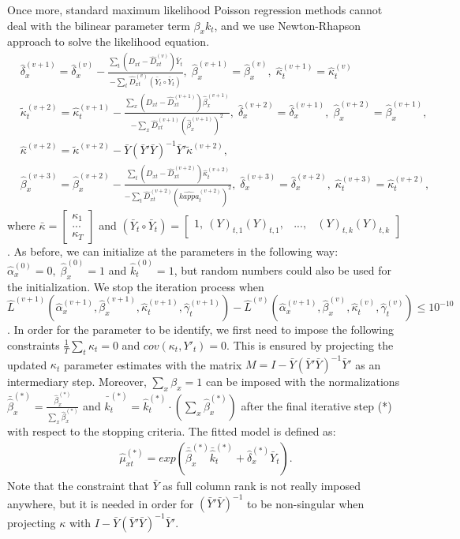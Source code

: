 \documentclass[AER, draftmode]{AEA}
\begin{document}
Once more, standard maximum likelihood Poisson regression methods cannot deal with the bilinear parameter term $\beta_xk_t$, and we use \cite{Goodman1979} Newton-Rhapson approach to solve the likelihood equation. 
\begin{align}
&\hat{\delta}_x^{(v+1)}=\hat{\delta}_x^{(v)}-\frac{\sum_t (D_{xt}-\hat{D}_{xt}^{(v)})\bar{Y}_t}{-\sum_t\hat{D}_{xt}^{(v)}(\bar{Y}_t\circ \bar{Y}_t)},\; \hat{\beta}_x^{(v+1)}=\hat{\beta}_x^{(v)},\;\hat{\kappa}_t^{(v+1)}=\hat{\kappa}_t^{(v)}\\
&\tilde{\kappa}_t^{(v+2)}=\hat{\kappa}_t^{(v+1)}-\frac{\sum_x(D_{xt}-\hat{D}_{xt}^{(v+1)})\hat{\beta}_x^{(v+1)}}{-\sum_x\hat{D}_{xt}^{(v+1)}(\hat{\beta}_x^{(v+1)})^2},\; \hat{\delta}_x^{(v+2)}=\hat{\delta}_x^{(v+1)},\;\hat{\beta}_x^{(v+2)}=\hat{\beta}_x^{(v+1)},\\
&\hat{\kappa}^{(v+2)}=\tilde{\kappa}^{(v+2)}-\bar{Y}(\bar{Y}'\bar{Y})^{-1}\bar{Y}'\tilde{\kappa}^{(v+2)},\\ \label{eq:proj_2}
&\hat{\beta}_x^{(v+3)}=\hat{\beta}_x^{(v+2)}-\frac{\sum_t (D_{xt}-\hat{D}_{xt}^{(v+2)})\hat{\kappa}_t^{(v+2)}}{-\sum_t\hat{D}_{xt}^{(v+2)}(\hat{kappa}_t^{(v+2)})^2},\; \hat{\delta}_x^{(v+3)}=\hat{\delta}_x^{(v+2)},\;\hat{\kappa}_t^{(v+3)}=\hat{\kappa}_t^{(v+2)},
\end{align}
where $\bar{\kappa} = \begin{bmatrix}
\kappa_1\\
...\\
\kappa_T
\end{bmatrix}$ and $(\bar{Y}_t\circ \bar{Y}_t) = \begin{bmatrix}
1, \ (Y)_{t,1}(Y)_{t,1}, & ..., & (Y)_{t,k}(Y)_{t,k}
\end{bmatrix}$. As before,
we can initialize at the parameters in the following way: $\hat{\alpha}_x^{(0)}=0,\;\hat{\beta}_x^{(0)}=1$ and $\hat{k}_t^{(0)}=1$, but random numbers could also be used for the initialization. We stop the iteration process when $\widehat{L}^{(v+1)}(\hat{\alpha}_x^{(v+1)},\hat{\beta}_x^{(v+1)},\hat{\kappa}_t^{(v+1)},\hat{\gamma}_t^{(v+1)})-\widehat{L}^{(v)}(\hat{\alpha}_x^{(v+1)},\hat{\beta}_x^{(v)},\hat{\kappa}_t^{(v)},\hat{\gamma}_t^{(v)})\leq 10^{-10}$. In order for the parameter to be identify, we first need to impose the following constraints $\frac{1}{T}\sum_t\kappa_t = 0$ and $cov(\kappa_t, Y'_t) = 0 $. This is ensured by projecting the updated $\kappa_t$ parameter estimates with the matrix $M = I-\bar{Y}(\bar{Y}'\bar{Y})^{-1}\bar{Y}'$ as an intermediary step. Moreover, $\sum_x \beta_x = 1$ can be imposed with the normalizations $\bar{\hat{\beta}}_x^{(*)}=\frac{\hat{\beta}_x^{(*)}}{\sum_x\hat{\beta}_x^{(*)}} $ and $\bar{\hat{k}}_t^{(*)}=\hat{k}_t^{(*)}\cdot (\sum_x\hat{\beta}_x^{(*)})$ after the final iterative step (*) with respect to the stopping criteria. The fitted model is defined as:
\begin{align}
\hat{\mu}_{xt}^{(*)}=exp(\bar{\hat{\beta}}_x^{(*)}\bar{\hat{k}}_t^{(*)}+ \hat{\delta}_x^{(*)}\bar{Y}_t).
\end{align}
Note that the constraint that $\bar{Y}$ as full column rank is not really imposed anywhere, but it is needed in order for $(\bar{Y}'\bar{Y})^{-1}$ to be non-singular when projecting $\kappa$ with $I-\bar{Y}(\bar{Y}'\bar{Y})^{-1}\bar{Y}'$.
\end{document}
